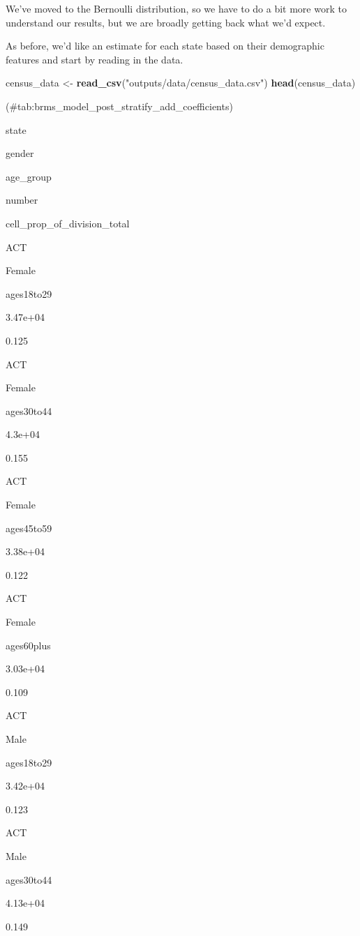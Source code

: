\documentclass[
]{book}
\newenvironment{Shaded}{\begin{snugshade}}{\end{snugshade}}
\newcommand{\KeywordTok}[1]{\textcolor[rgb]{0.13,0.29,0.53}{\textbf{#1}}}
\newcommand{\NormalTok}[1]{#1}
\newcommand{\StringTok}[1]{\textcolor[rgb]{0.31,0.60,0.02}{#1}}
\begin{document}
We've moved to the Bernoulli distribution, so we have to do a bit more work to understand our results, but we are broadly getting back what we'd expect.

As before, we'd like an estimate for each state based on their demographic features and start by reading in the data.

\begin{Shaded}
\begin{Highlighting}[]
\NormalTok{census_data <-}\StringTok{ }\KeywordTok{read_csv}\NormalTok{(}\StringTok{"outputs/data/census_data.csv"}\NormalTok{)}
\KeywordTok{head}\NormalTok{(census_data)}
\end{Highlighting}
\end{Shaded}

(\#tab:brms\_model\_post\_stratify\_add\_coefficients)

state

gender

age\_group

number

cell\_prop\_of\_division\_total

ACT

Female

ages18to29

3.47e+04

0.125

ACT

Female

ages30to44

4.3e+04~

0.155

ACT

Female

ages45to59

3.38e+04

0.122

ACT

Female

ages60plus

3.03e+04

0.109

ACT

Male

ages18to29

3.42e+04

0.123

ACT

Male

ages30to44

4.13e+04

0.149
\end{document}
